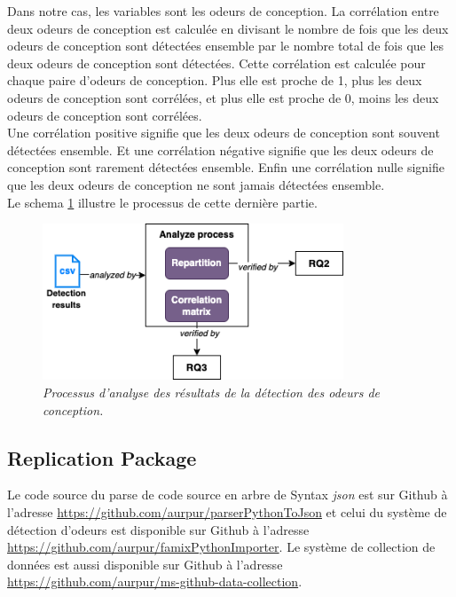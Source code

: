 Dans notre cas, les variables sont les odeurs de conception. La corrélation entre deux odeurs de conception est
calculée en divisant le nombre de fois que les deux odeurs de conception sont
détectées ensemble par le nombre total de fois que les deux odeurs de conception
sont détectées. Cette corrélation est calculée pour chaque paire d'odeurs de
conception. Plus elle est proche de 1, plus les deux odeurs de conception sont
corrélées, et plus elle est proche de 0, moins les deux odeurs de conception
sont corrélées.\\

Une corrélation positive signifie que les deux odeurs de conception
sont souvent détectées ensemble. Et une corrélation négative signifie que les deux odeurs de conception sont rarement
détectées ensemble. Enfin une corrélation nulle signifie que les deux odeurs de
conception ne sont jamais détectées ensemble.\\

Le schema \ref{fig:analysis} illustre le processus de cette dernière partie.\\

\begin{figure}[h]
  \centering
  \includegraphics[width=0.8\textwidth]{figure/design_smell_analyze.png}
  \caption{\emph{Processus d'analyse des résultats de la détection des odeurs de conception.}}
  \label{fig:analysis}
\end{figure}

\subsection{Replication Package}
\label{sec:Replication Package}
Le code source du parse de code source en arbre de Syntax \emph{json} est sur
Github à l'adresse \url{https://github.com/aurpur/parserPythonToJson} et celui du
système de détection d'odeurs est disponible sur Github à l'adresse
\url{https://github.com/aurpur/famixPythonImporter}. Le système
de collection de données est aussi disponible sur Github à l'adresse
\url{https://github.com/aurpur/ms-github-data-collection}.\\
